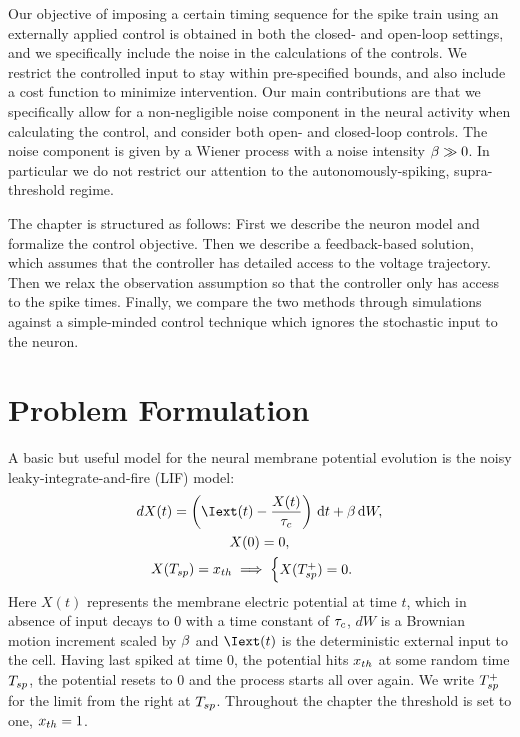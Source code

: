 Our objective of imposing a certain timing sequence for the spike train using an
externally applied control is obtained in both the closed- and
open-loop settings, and we specifically include the noise in the
calculations of the controls. We restrict the controlled input to stay
within pre-specified bounds, and also include a cost function to
minimize intervention.
Our main contributions are that we specifically allow for a
non-negligible noise component in the neural activity when calculating
the control, and consider both open- and closed-loop controls. The
noise component is given by a Wiener process with a noise intensity
$\beta \gg 0$. 
In particular we do not restrict our attention to the autonomously-spiking,
supra-threshold regime.

The chapter is structured as follows: First we describe the neuron model and
formalize the control objective. Then we describe a feedback-based solution,
which assumes that the controller has detailed access to the voltage trajectory.
Then we relax the observation assumption so that the controller only has access
to the spike times. Finally, we compare the two methods through
simulations against a simple-minded control technique which ignores
the stochastic input to the neuron.

\section{Problem Formulation}
A basic but useful model for the neural membrane potential evolution is the
noisy leaky-integrate-and-fire (LIF) model:
\begin{equation}
\begin{gathered}
dX(t) = \left(\Iext(t) - \frac{X(t)}{\tc} \right) \intd{t} + \b \intd{W},
\\
X(0) = 0,
\\
X(\ts) = \xth \implies
\begin{cases}
X(\ts^+) = 0. & 
\end{cases}
\end{gathered}
\label{eq:X_evolution_uo_control_opt_spike}
\end{equation}
Here $X(t)$ represents the membrane electric potential at time $t$, which in
absence of input decays to $0$ with a time constant of $\tau_c$, $dW$ is a Brownian
motion increment scaled by $\beta$ and $\Iext(t)$ is the deterministic external input to the cell. Having last
spiked at time $0$, the potential hits ${ x_{th} }$ at some random time $T_{sp}$, the
potential resets to $0$ and the process starts all over again. 
We write $T_{sp}^+$ for the limit from the right at $T_{sp}$.
Throughout the chapter the threshold is set to one, ${ x_{th} } = 1$.

